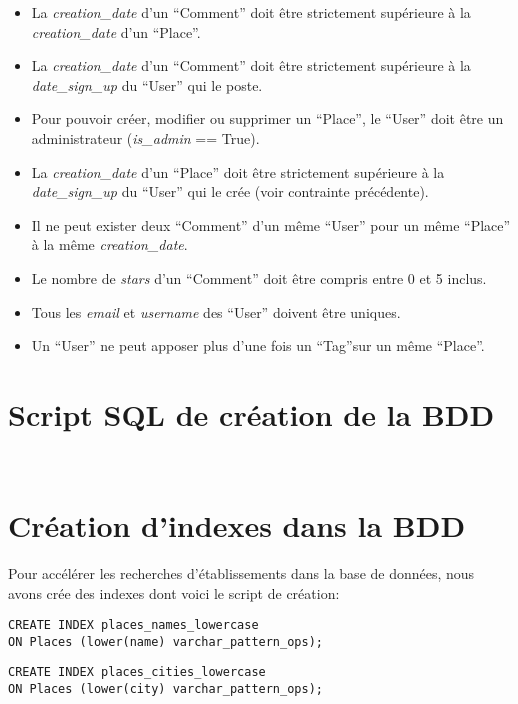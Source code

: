 \documentclass[a4paper,10pt]{article}
\begin{document}
\begin{itemize}
  \item La \emph{creation\_date} d'un ``Comment'' doit être strictement supérieure à la \emph{creation\_date} d'un ``Place''.
  \item La \emph{creation\_date} d'un ``Comment'' doit être strictement supérieure à la \emph{date\_sign\_up} du ``User'' qui le poste.
  \item Pour pouvoir créer, modifier ou supprimer un ``Place'', le ``User'' doit être un administrateur (\emph{is\_admin} == True).
  \item La \emph{creation\_date} d'un ``Place'' doit être strictement supérieure à la \emph{date\_sign\_up}
  du ``User'' qui le crée (voir contrainte précédente).
  \item Il ne peut exister deux ``Comment'' d'un même ``User'' pour un même ``Place'' à la même \emph{creation\_date}.
  \item Le nombre de \emph{stars} d'un ``Comment'' doit être compris entre 0 et 5 inclus.
  \item Tous les \emph{email} et \emph{username} des ``User'' doivent être uniques.
  \item Un ``User'' ne peut apposer plus d'une fois un ``Tag''sur un même ``Place''.
\end{itemize}

\newpage

\section{Script SQL de création de la BDD}

\inputminted[bgcolor=black,firstline=1,lastline=46]{sql}{./../src/creation.sql}
\newpage
\inputminted[bgcolor=black,firstline=47]{sql}{./../src/creation.sql}

\section{Création d'indexes dans la BDD}

Pour accélérer les recherches d'établissements dans la base de données, nous avons crée des indexes dont voici le script de création:

\begin{verbatim}
CREATE INDEX places_names_lowercase
ON Places (lower(name) varchar_pattern_ops);
\end{verbatim}

\begin{verbatim}
CREATE INDEX places_cities_lowercase
ON Places (lower(city) varchar_pattern_ops);
\end{verbatim}
\end{document}
